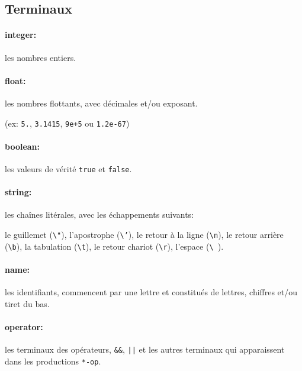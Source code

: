 \documentclass[paper=a4, fontsize=11pt]{scrartcl}
\numberwithin{equation}{section}		%
\numberwithin{figure}{section}			%
\numberwithin{table}{section}				%
\begin{document}
\subsection{Terminaux}

\paragraph{integer:} les nombres entiers.

\paragraph{float:} les nombres flottants, avec décimales et/ou exposant.
\begin{small}
    (ex: \texttt{5.}, \texttt{3.1415}, \texttt{9e+5} ou \texttt{1.2e-67})
\end{small}

\paragraph{boolean:} les valeurs de vérité \texttt{true} et \texttt{false}.

\paragraph{string:} les chaînes litérales, avec les échappements suivants: 
\begin{small}
    le guillemet (\texttt{\textbackslash "}),
    l'apostrophe (\texttt{\textbackslash '}),
    le retour à la ligne (\texttt{\textbackslash n}),
    le retour arrière (\texttt{\textbackslash b}),
    la tabulation (\texttt{\textbackslash t}),
    le retour chariot (\texttt{\textbackslash r}),
    l'espace (\texttt{\textbackslash ~}).
\end{small}

\paragraph{name:} les identifiants, commencent par une lettre et constitués de lettres, chiffres et/ou tiret du bas.

\paragraph{operator:} les terminaux des opérateurs, \texttt{\&\&}, \texttt{||} et les autres terminaux qui apparaissent dans les productions \texttt{*-op}.
\end{document}
